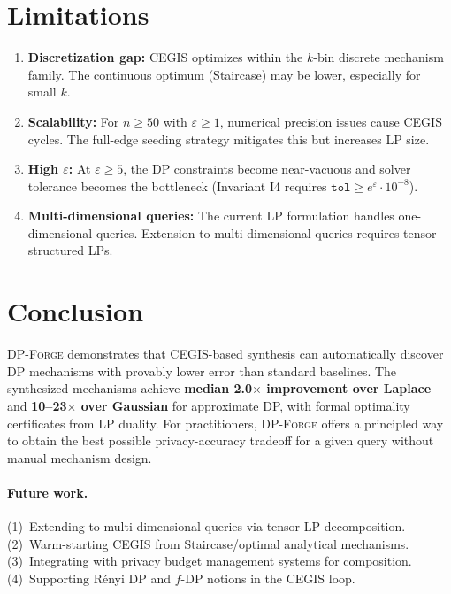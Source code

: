 \documentclass[11pt,a4paper]{article}
\begin{document}
\section{Limitations}
\label{sec:limitations}

\begin{enumerate}
\item \textbf{Discretization gap:} CEGIS optimizes within the $k$-bin
      discrete mechanism family.  The continuous optimum (Staircase) may
      be lower, especially for small $k$.
\item \textbf{Scalability:} For $n \ge 50$ with $\varepsilon \ge 1$,
      numerical precision issues cause CEGIS cycles.  The full-edge
      seeding strategy mitigates this but increases LP size.
\item \textbf{High $\varepsilon$:} At $\varepsilon \ge 5$, the DP constraints
      become near-vacuous and solver tolerance becomes the bottleneck
      (Invariant I4 requires $\texttt{tol} \ge e^\varepsilon \cdot 10^{-8}$).
\item \textbf{Multi-dimensional queries:} The current LP formulation handles
      one-dimensional queries.  Extension to multi-dimensional queries
      requires tensor-structured LPs.
\end{enumerate}

\section{Conclusion}
\label{sec:conclusion}

\textsc{DP-Forge} demonstrates that CEGIS-based synthesis can automatically
discover DP mechanisms with provably lower error than standard baselines.
The synthesized mechanisms achieve \textbf{median 2.0$\times$ improvement
over Laplace} and \textbf{10--23$\times$ over Gaussian} for approximate DP,
with formal optimality certificates from LP duality.  For practitioners,
\textsc{DP-Forge} offers a principled way to obtain the best possible
privacy-accuracy tradeoff for a given query without manual mechanism design.

\paragraph{Future work.}
(1)~Extending to multi-dimensional queries via tensor LP decomposition.
(2)~Warm-starting CEGIS from Staircase/optimal analytical mechanisms.
(3)~Integrating with privacy budget management systems for composition.
(4)~Supporting Rényi DP and $f$-DP notions in the CEGIS loop.
\end{document}

